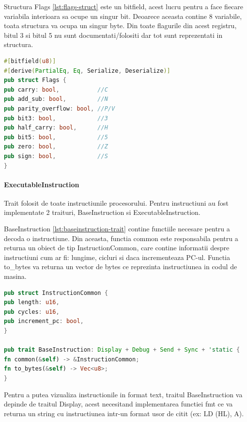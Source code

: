 \documentclass[titlepage,12pt]{article}
\DeclareRobustCommand{\code}[1]{{\ttfamily\small #1}}
\begin{document}
Structura \code{Flags} \cref{lst:flags-struct} este un bitfield, acest lucru pentru a face fiecare variabila interioara sa ocupe un singur bit. Deoarece aceasta contine 8 variabile, toata structura va ocupa un singur byte. Din toate flagurile din acest registru, bitul 3 si bitul 5 nu sunt documentati/folositi dar tot sunt reprezentati in structura.

\begin{lstlisting}[language=Rust,caption={Structura Flags},label={lst:flags-struct}]
#[bitfield(u8)]
#[derive(PartialEq, Eq, Serialize, Deserialize)]
pub struct Flags {
pub carry: bool,           //C
pub add_sub: bool,         //N
pub parity_overflow: bool, //P/V
pub bit3: bool,            //3
pub half_carry: bool,      //H
pub bit5: bool,            //5
pub zero: bool,            //Z
pub sign: bool,            //S
}
\end{lstlisting}

\paragraph{\code{ExecutableInstruction}} Trait folosit de toate instructiunile procesorului.
Pentru instructiuni au fost implementate 2 traituri, \code{BaseInstruction} si \code{ExecutableInstruction}.

\code{BaseInstruction} \cref{lst:baseinstruction-trait} contine functiile necesare pentru a decoda o instructiune. Din aceasta, functia common este responsabila pentru a returna un obiect de tip \code{InstructionCommon}, care contine informatii despre instructiuni cum ar fi: lungime, cicluri si daca incrementeaza PC-ul. Functia \code{to\_bytes} va returna un vector de bytes ce reprezinta instructiunea in codul de masina.

\begin{lstlisting}[language=Rust,caption={Trait BaseInstruction},label={lst:baseinstruction-trait}]
pub struct InstructionCommon {
pub length: u16,
pub cycles: u16,
pub increment_pc: bool,
}

pub trait BaseInstruction: Display + Debug + Send + Sync + 'static {
fn common(&self) -> &InstructionCommon;
fn to_bytes(&self) -> Vec<u8>;
}
\end{lstlisting}
Pentru a putea vizualiza instructionile in format text, traitul \code{BaseInstruction} va depinde de traitul \code{Display}, acest necesitand implementarea functiei \code{fmt} ce va returna un string cu instructiunea intr-un format usor de citit (ex: \code{LD (HL), A}).
\end{document}

